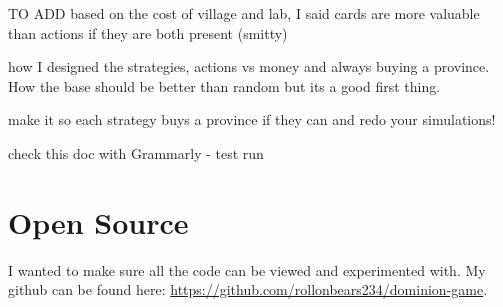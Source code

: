 \documentclass[11pt, oneside]{article}   	%
\begin{document}
TO ADD
based on the cost of village and lab, I said cards are more valuable than actions if they are both present (smitty)

how I designed the strategies, actions vs money and always buying a province. How the base should be better than random but its a good first thing. 

make it so each strategy buys a province if they can and redo your simulations!

check this doc with Grammarly - test run


\section{Open Source}

I wanted to make sure all the code can be viewed and experimented with. My github can be found here: \url{https://github.com/rollonbears234/dominion-game}. 



\end{document}
